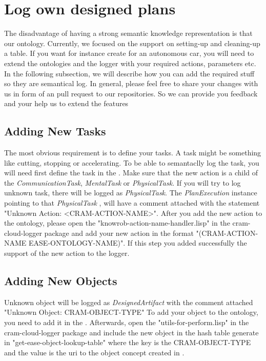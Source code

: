 \section{Log own designed plans}
The disadvantage of having a strong semantic knowledge representation is that our ontology.
Currently, we focused on the support on setting-up and cleaning-up a table.
If you want for instance create \neems for an autonomous car, you will need to extend the \ease ontologies and the logger with your required actions, parameters etc.
In the following subsection, we will describe how you can add the required stuff so they are semantical log.
In general, please feel free to share your changes with us in form of an pull request to our repositories.
So we can provide you feedback and your help us to extend the features

\subsection{Adding New Tasks}
The most obvious requirement is to define your tasks.
A task might be something like cutting, stopping or accelerating.
To be able to semantaclly log the task, you will need first define the task in the \easeAct.
Make sure that the new action is a child of the \textit{CommunicationTask}, \textit{MentalTask} or \textit{PhysicalTask}.
If you will try to log unknown task, there will be logged as \textit{PhysicalTask}.
The \textit{PlanExecution} instance pointing to that \textit{PhysicalTask} , will have a comment attached with the statement "Unknown Action: <CRAM-ACTION-NAME>".
After you add the new action to the ontology, please open the "knowrob-action-name-handler.lisp" in the cram-cloud-logger package and add your new action in the format "(CRAM-ACTION-NAME EASE-ONTOLOGY-NAME)".
If this step you added successfully the support of the new action to the logger.

\subsection{Adding New Objects}
Unknown object will be logged as \textit{DesignedArtifact} with the comment attached "Unknown Object: CRAM-OBJECT-TYPE"
To add your object to the ontology, you need to add it in the \easeObj.
Afterwards, open the "utils-for-perform.lisp" in the 
cram-cloud-logger package and include the new object in the hash table generate in "get-ease-object-lookup-table" where the key is the CRAM-OBJECT-TYPE and the value is the uri to the object concept created in \easeObj.

